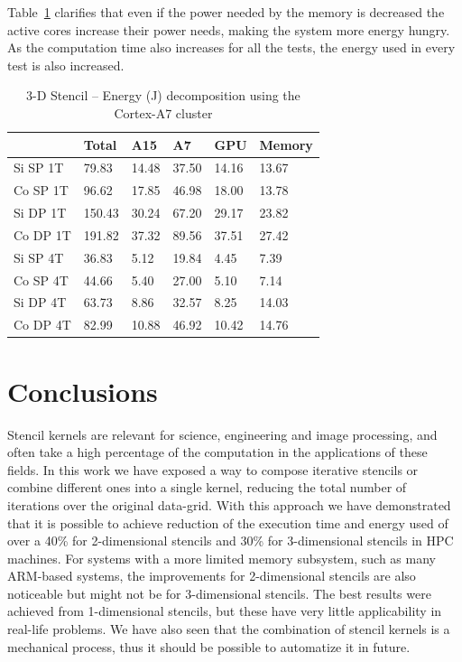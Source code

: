 \documentclass{acm_proc_article-sp}
\begin{document}
Table~\ref{tbl:energy-A7-3D} clarifies that even if the power needed by the memory is decreased the active cores increase their power needs, making the system more energy hungry. As the computation time also increases for all the tests, the energy used in every test is also increased.
\begin{table}[ht]
  \begin{center}
    \begin{tabular}{| l | l | l | l | l | l |}
      \hline
               & Total  & A15   & A7    & GPU   & Memory \\ \hline
      Si SP 1T & 79.83  & 14.48 & 37.50 & 14.16 & 13.67  \\ \hline
      Co SP 1T & 96.62  & 17.85 & 46.98 & 18.00 & 13.78  \\ \hline
      Si DP 1T & 150.43 & 30.24 & 67.20 & 29.17 & 23.82  \\ \hline
      Co DP 1T & 191.82 & 37.32 & 89.56 & 37.51 & 27.42  \\ \hline
      Si SP 4T & 36.83  & 5.12  & 19.84 & 4.45  & 7.39   \\ \hline
      Co SP 4T & 44.66  & 5.40  & 27.00 & 5.10  & 7.14   \\ \hline
      Si DP 4T & 63.73  & 8.86  & 32.57 & 8.25  & 14.03  \\ \hline
      Co DP 4T & 82.99  & 10.88 & 46.92 & 10.42 & 14.76  \\ \hline
    \end{tabular}
    \caption{3-D Stencil -- Energy (J) decomposition using the Cortex-A7 cluster}
    \label{tbl:energy-A7-3D}
  \end{center}
\end{table}




\section{Conclusions}
\label{conclusions}
Stencil kernels are relevant for science, engineering and image processing, and often take a high percentage of the computation in the applications of these fields. In this work we have exposed a way to compose iterative stencils or combine different ones into a single kernel, reducing the total number of iterations over the original data-grid. With this approach we have demonstrated that it is possible to achieve reduction of the execution time and energy used of over a 40\% for 2-dimensional stencils and 30\% for 3-dimensional stencils in HPC machines. For systems with a more limited memory subsystem, such as many ARM-based systems, the improvements for 2-dimensional stencils are also noticeable but might not be for 3-dimensional stencils. The best results were achieved from 1-dimensional stencils, but these have very little applicability in real-life problems. We have also seen that the combination of stencil kernels is a mechanical process, thus it should be possible to automatize it in future.
\end{document}
